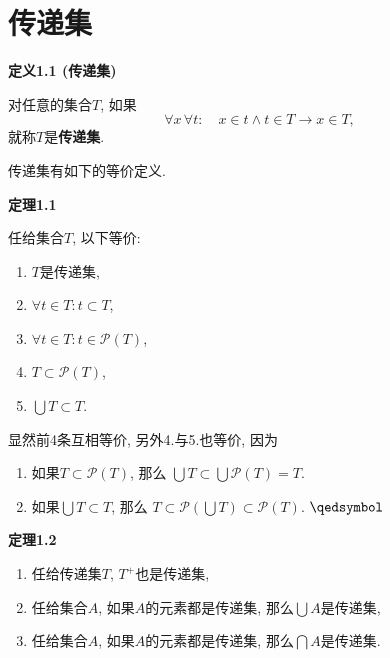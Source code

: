 \documentclass[UTF8]{ctexart}
\begin{document}
\setlength{\abovedisplayskip}{1pt}
\setlength{\belowdisplayskip}{1pt}

\section{传递集}

\hypertarget{sec:定义1.1}{}
\noindent\textbf{定义1.1 (传递集)}

对任意的集合$T$, 如果
\[
    \forall x\,\forall t:\quad x\in t\land t\in T\to x\in T,
\]
就称$T$是\textbf{传递集}.

\vspace{10pt}

传递集有如下的等价定义.

\vspace{10pt}

\hypertarget{sec:定理1.1}{}
\noindent\textbf{定理1.1}

任给集合$T$, 以下等价:
\begin{enumerate}
    \item $T$是传递集,
    \item $\forall t\in T:t\subset T$,
    \item $\forall t\in T:t\in\mathcal{P}(T)$,
    \item $T\subset\mathcal{P}(T)$,
    \item $\displaystyle\bigcup T\subset T$.
\end{enumerate}


显然前4条互相等价, 另外4.与5.也等价, 因为
\vspace{3pt}
\begin{enumerate}
    \item 如果$T\subset\mathcal{P}(T)$, 那么
    $\displaystyle\bigcup T\subset\bigcup\mathcal{P}(T)=T$.
    \vspace{3pt}
    \item 如果$\displaystyle\bigcup T\subset T$, 那么
    $\displaystyle T\subset\mathcal{P}\left(\bigcup T\right)
    \subset\mathcal{P}(T)$. \hfill $\qedsymbol$
\end{enumerate}

\vspace{10pt}

\hypertarget{sec:定理1.2}{}
\noindent\textbf{定理1.2}

\begin{enumerate}
    \item 任给传递集$T$, $T^+$也是传递集,
    \item 任给集合$A$, 如果$A$的元素都是传递集, 那么$\displaystyle\bigcup A$是传递集,
    \item 任给集合$A$, 如果$A$的元素都是传递集, 那么$\displaystyle\bigcap A$是传递集.
\end{enumerate}
\end{document}
